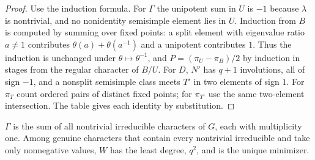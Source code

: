 
\begin{proof}
Use the induction formula. For $\Gamma$ the unipotent sum in $U$ is $-1$
because $\lambda$ is nontrivial, and no nonidentity semisimple element lies in
$U$. Induction from $B$ is computed by summing over fixed points: a split
element with eigenvalue ratio $a\ne1$ contributes $\theta(a)+\theta(a^{-1})$
and a unipotent contributes $1$. Thus the induction is unchanged under
$\theta\mapsto\theta^{-1}$, and $P=(\pi_U-\pi_B)/2$ by induction in stages
from the regular character of $B/U$. For $D$, $N'$ has $q+1$ involutions, all
of sign $-1$, and a nonsplit semisimple class meets $T'$ in two elements of
sign $1$. For $\pi_T$ count ordered pairs of distinct fixed points; for
$\pi_{T'}$ use the same two-element intersection. The table gives each
identity by substitution.
\end{proof}

\begin{theorem}\label{grp:thm:psl-detector}
$\Gamma$ is the sum of all nontrivial irreducible characters of $G$, each with
multiplicity one. Among genuine characters that contain every nontrivial
irreducible and take only nonnegative values, $W$ has the least degree, $q^2$,
and is the unique minimizer.
\end{theorem}

